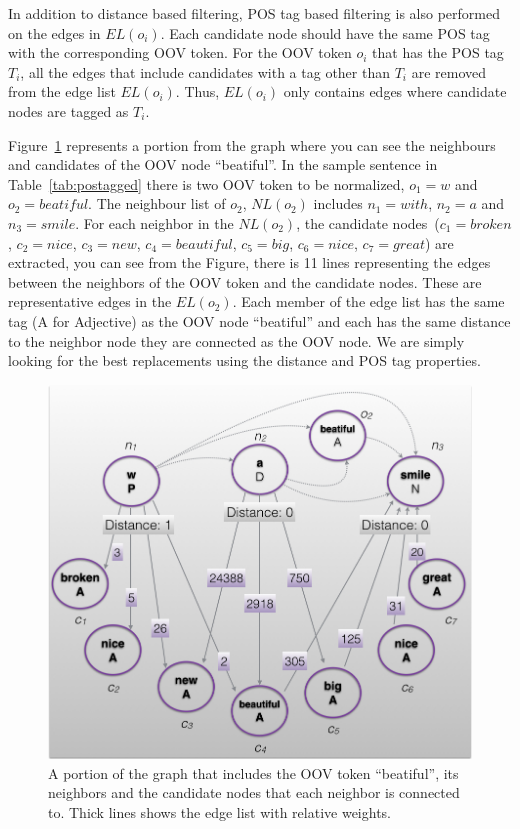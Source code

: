 \documentclass[a4paper,onesided,12pt]{report}
\begin{document}
In addition to distance based filtering, POS tag based filtering is also performed on the edges in $EL(o_i)$. Each candidate node should have the same POS tag with the corresponding OOV token. For the OOV token $o_i$ that has the POS tag $T_i$, all the edges that include candidates with a tag other than $T_i$ are removed from the edge list $EL(o_{i})$. Thus, $EL(o_{i})$ only contains edges where candidate nodes are tagged as $T_i$.

Figure~\ref{fig:edgeWeight} represents a portion from the graph where you can see the neighbours  and candidates of the OOV node ``beatiful''. In the sample sentence in Table~\ref{tab:postagged} there is two OOV token to be normalized, $o_1=w$ and $o_2=beatiful$. The neighbour list of $o_2$, $NL(o_2)$ includes  $n_1=with$, $n_2=a$ and $n_3=smile$. For each neighbor in the $NL(o_2)$, the candidate nodes~($c_1=broken$, $c_2=nice$, $c_3=new$, $c_4=beautiful$, $c_5=big$, $c_6=nice$, $c_7=great$) are extracted, you can see from the Figure, there is 11 lines representing the edges between the neighbors of the OOV token and the candidate nodes. These are representative edges in the $EL(o_2)$. Each member of the edge list has the same tag (A for Adjective) as the OOV node ``beatiful'' and each has the same distance to the neighbor node they are connected as the OOV node. We are simply looking for the best replacements using the distance and POS tag properties.

\begin{figure}[htb]
\begin{center}
\includegraphics[scale=0.5]{fig/edgeWeight}
\caption{A portion of the graph that includes the OOV token ``beatiful'', its neighbors and the candidate nodes that each neighbor is connected to. Thick lines shows the edge list with relative weights.}
\label{fig:edgeWeight}
\end{center}
\end{figure}
\end{document}
